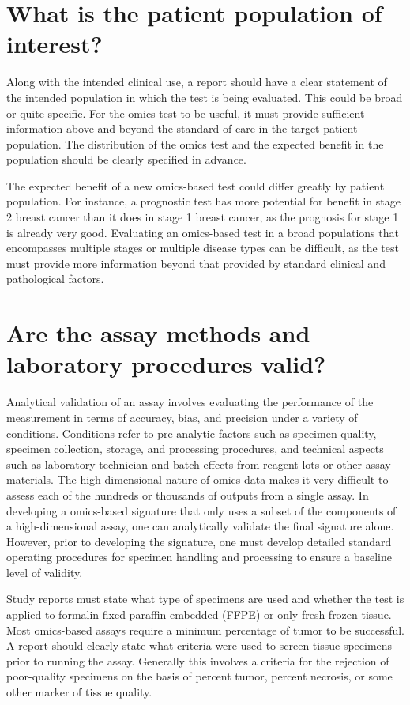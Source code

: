 \documentclass[11pt]{article}
\begin{document}
\section{What is the patient population of
interest?}\label{what-is-the-patient-population-of-interest}

Along with the intended clinical use, a report should have a clear
statement of the intended population in which the test is being
evaluated. This could be broad or quite specific. For the omics test to
be useful, it must provide sufficient information above and beyond the
standard of care in the target patient population. The distribution of
the omics test and the expected benefit in the population should be
clearly specified in advance.

The expected benefit of a new omics-based test could differ greatly by
patient population. For instance, a prognostic test has more potential
for benefit in stage 2 breast cancer than it does in stage 1 breast
cancer, as the prognosis for stage 1 is already very good. Evaluating an
omics-based test in a broad populations that encompasses multiple stages
or multiple disease types can be difficult, as the test must provide
more information beyond that provided by standard clinical and
pathological factors.

\section{Are the assay methods and laboratory procedures
valid?}\label{are-the-assay-methods-and-laboratory-procedures-valid}

Analytical validation of an assay involves evaluating the performance of
the measurement in terms of accuracy, bias, and precision under a
variety of conditions. Conditions refer to pre-analytic factors such as
specimen quality, specimen collection, storage, and processing
procedures, and technical aspects such as laboratory technician and
batch effects from reagent lots or other assay materials. The
high-dimensional nature of omics data makes it very difficult to assess
each of the hundreds or thousands of outputs from a single assay. In
developing a omics-based signature that only uses a subset of the
components of a high-dimensional assay, one can analytically validate
the final signature alone. However, prior to developing the signature,
one must develop detailed standard operating procedures for specimen
handling and processing to ensure a baseline level of validity.

Study reports must state what type of specimens are used and whether the
test is applied to formalin-fixed paraffin embedded (FFPE) or only
fresh-frozen tissue. Most omics-based assays require a minimum
percentage of tumor to be successful. A report should clearly state what
criteria were used to screen tissue specimens prior to running the
assay. Generally this involves a criteria for the rejection of
poor-quality specimens on the basis of percent tumor, percent necrosis,
or some other marker of tissue quality.
\end{document}
